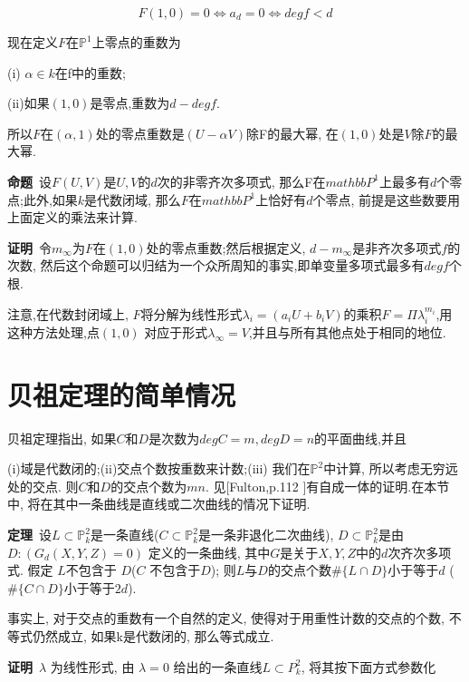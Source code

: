 \documentclass[UTF8]{book}
\begin{document}
		\begin{equation*}
			F(1,0)=0\Leftrightarrow a_{d}=0\Leftrightarrow deg f<d
		\end{equation*}
		
		现在定义$ F $在$\mathbb{P}^{1}$上零点的重数为
		
		
		(i) $\alpha \in k$在f中的重数;
		
		
		(ii)如果$ (1,0) $是零点,重数为$ d-deg f $.
		
		
		所以$ F $在$ (\alpha,1) $处的零点重数是$ (U-\alpha V) $除F的最大幂, 在$ (1,0) $处是$ V $除$ F $的最大幂.
		
	
		\textbf{命题}\ 设$ F(U,V) $是$ U,V $的$ d $次的非零齐次多项式, 那么F在$mathbb{P}^{1}$上最多有$ d $个零点;此外,如果$ k $是代数闭域, 那么$ F $在$mathbb{P}^{1}$上恰好有$ d $个零点, 前提是这些数要用上面定义的乘法来计算.
		
		
		\textbf{证明}\ 令$m_{\infty}$为$ F $在$ (1,0) $处的零点重数;然后根据定义, $d-m_{\infty}$是非齐次多项式$ f $的次数, 然后这个命题可以归结为一个众所周知的事实,即单变量多项式最多有$ deg f $个根.
		
		
		注意,在代数封闭域上, $ F $将分解为线性形式$\lambda_{i}=(a_{i}U+b_{i}V)$的乘积$F=\Pi\lambda_{i}^{m_{i}}$,用这种方法处理,点$ (1,0) $ 对应于形式$\lambda_{\infty}=V$,并且与所有其他点处于相同的地位.
	\section{贝祖定理的简单情况}
		贝祖定理指出, 如果$ C $和$ D $是次数为$ deg C=m, deg D=n $的平面曲线,并且
		
		
		(i)域是代数闭的;(ii)交点个数按重数来计数;(iii) 我们在$\mathbb{P}^{2}$中计算, 所以考虑无穷远处的交点. 则$ C $和$ D $的交点个数为$ mn $. 见[Fulton,p.112 ]有自成一体的证明.在本节中, 将在其中一条曲线是直线或二次曲线的情况下证明.
		
		
		\textbf{定理}\ 设$L\subset \mathbb{P}^{2}_{k}$是一条直线($C\subset \mathbb{P}^{2}_{k}$是一条非退化二次曲线), $D\subset \mathbb{P}^{2}_{k}$是由$D:(G_{d}(X,Y,Z)=0)$ 定义的一条曲线, 其中$ G $是关于$ X, Y, Z $中的$ d $次齐次多项式. 假定 $ L $不包含于 $ D $($ C $ 不包含于$ D $); 则$ L $与$ D $的交点个数$\# \{L\cap D\}$小于等于$ d $ ($\# \{C\cap D\}$小于等于$ 2d $).
		
		
		事实上, 对于交点的重数有一个自然的定义, 使得对于用重性计数的交点的个数, 不等式仍然成立, 如果k是代数闭的, 那么等式成立.
		
		
		\textbf{证明}\ $\lambda$ 为线性形式, 由 $\lambda=0$ 给出的一条直线$L\subset P^{2}_{k}$, 将其按下面方式参数化
		
\end{document}
